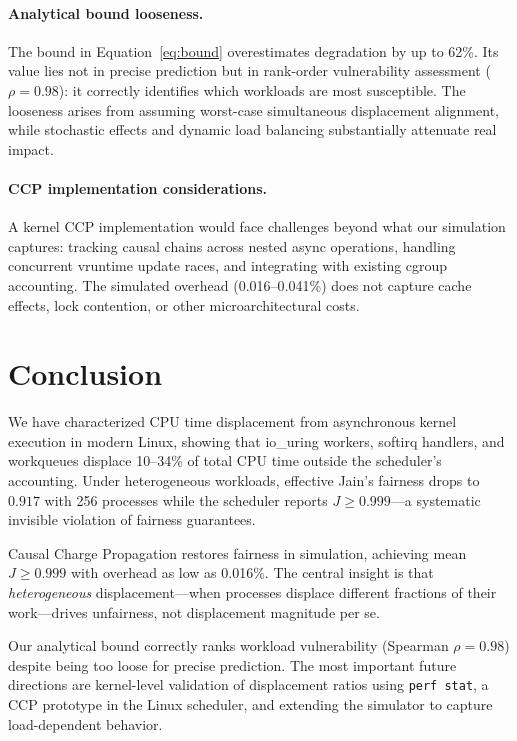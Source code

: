 \documentclass{article}
\begin{document}
\paragraph{Analytical bound looseness.}
The bound in Equation~\ref{eq:bound} overestimates degradation by up to 62\%. Its value lies not in precise prediction but in rank-order vulnerability assessment ($\rho = 0.98$): it correctly identifies which workloads are most susceptible. The looseness arises from assuming worst-case simultaneous displacement alignment, while stochastic effects and dynamic load balancing substantially attenuate real impact.

\paragraph{CCP implementation considerations.}
A kernel CCP implementation would face challenges beyond what our simulation captures: tracking causal chains across nested async operations, handling concurrent vruntime update races, and integrating with existing cgroup accounting. The simulated overhead (0.016--0.041\%) does not capture cache effects, lock contention, or other microarchitectural costs.

\section{Conclusion}
\label{sec:conclusion}

We have characterized CPU time displacement from asynchronous kernel execution in modern Linux, showing that io\_uring workers, softirq handlers, and workqueues displace 10--34\% of total CPU time outside the scheduler's accounting. Under heterogeneous workloads, effective Jain's fairness drops to $0.917$ with 256 processes while the scheduler reports $J \geq 0.999$---a systematic invisible violation of fairness guarantees.

Causal Charge Propagation restores fairness in simulation, achieving mean $J \geq 0.999$ with overhead as low as 0.016\%. The central insight is that \emph{heterogeneous} displacement---when processes displace different fractions of their work---drives unfairness, not displacement magnitude per se.

Our analytical bound correctly ranks workload vulnerability (Spearman $\rho = 0.98$) despite being too loose for precise prediction. The most important future directions are kernel-level validation of displacement ratios using \texttt{perf stat}, a CCP prototype in the Linux scheduler, and extending the simulator to capture load-dependent behavior.



\end{document}
